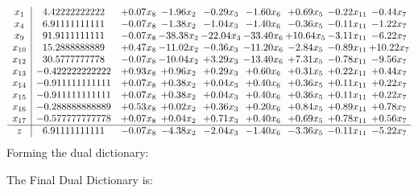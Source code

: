 \documentclass[8pt]{article}
\begin{document}
\[\begin{array}{c| c c@{\hskip 2pt} c@{\hskip 2pt} c@{\hskip 2pt} c@{\hskip 2pt} c@{\hskip 2pt} c@{\hskip 2pt} c@{\hskip 2pt} }
 x_{1}   &  4.42222222222 & +  0.07 x_{8} & -1.96 x_{2} & -0.29 x_{3} & -1.60 x_{6} & +  0.69 x_{5} & -0.22 x_{11} & -0.44 x_{7}\\
 x_{4}   &  6.91111111111 & -0.07 x_{8} & -1.38 x_{2} & -1.04 x_{3} & -1.40 x_{6} & -0.36 x_{5} & -0.11 x_{11} & -1.22 x_{7}\\
 x_{9}   &  91.9111111111 & -0.07 x_{8} & -38.38 x_{2} & -22.04 x_{3} & -33.40 x_{6} & + 10.64 x_{5} & -3.11 x_{11} & -6.22 x_{7}\\
 x_{10}   &  15.2888888889 & +  0.47 x_{8} & -11.02 x_{2} & -0.36 x_{3} & -11.20 x_{6} & -2.84 x_{5} & -0.89 x_{11} & + 10.22 x_{7}\\
 x_{12}   &  30.5777777778 & -0.07 x_{8} & -10.04 x_{2} & +  3.29 x_{3} & -13.40 x_{6} & +  7.31 x_{5} & -0.78 x_{11} & -9.56 x_{7}\\
 x_{13}   &  -0.422222222222 & +  0.93 x_{8} & +  0.96 x_{2} & +  0.29 x_{3} & +  0.60 x_{6} & +  0.31 x_{5} & +  0.22 x_{11} & +  0.44 x_{7}\\
 x_{14}   &  -0.911111111111 & +  0.07 x_{8} & +  0.38 x_{2} & +  0.04 x_{3} & +  0.40 x_{6} & +  0.36 x_{5} & +  0.11 x_{11} & +  0.22 x_{7}\\
 x_{15}   &  -0.911111111111 & +  0.07 x_{8} & +  0.38 x_{2} & +  0.04 x_{3} & +  0.40 x_{6} & +  0.36 x_{5} & +  0.11 x_{11} & +  0.22 x_{7}\\
 x_{16}   &  -0.288888888889 & +  0.53 x_{8} & +  0.02 x_{2} & +  0.36 x_{3} & +  0.20 x_{6} & +  0.84 x_{5} & +  0.89 x_{11} & +  0.78 x_{7}\\
 x_{17}   &  -0.577777777778 & +  0.07 x_{8} & +  0.04 x_{2} & +  0.71 x_{3} & +  0.40 x_{6} & +  0.69 x_{5} & +  0.78 x_{11} & +  0.56 x_{7}\\
\hline
z    &  6.91111111111 & -0.07 x_{8} & -4.38 x_{2} & -2.04 x_{3} & -1.40 x_{6} & -3.36 x_{5} & -0.11 x_{11} & -5.22 x_{7}\\
\end{array}\]
Forming the dual dictionary:

The Final Dual Dictionary is: 
\end{document}
